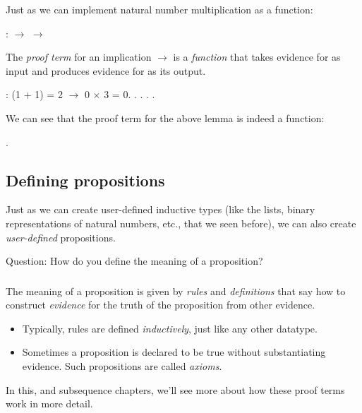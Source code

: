 \documentclass[12pt]{report}
\begin{document}
 Just as we can implement natural number multiplication as a
function:



 :  \ensuremath{\rightarrow}  \ensuremath{\rightarrow}  



The \textit{proof term} for an implication  \ensuremath{\rightarrow}  is a \textit{function} that
takes evidence for  as input and produces evidence for  as its
output.
\begin{coqdoccode}
\coqdocemptyline
\coqdocnoindent
{}  : (1 + 1) = 2  \ensuremath{\rightarrow}  0 \ensuremath{\times} 3 = 0.\coqdoceol
\coqdocnoindent
{}.  . . .\coqdoceol
\coqdocemptyline
\end{coqdoccode}
We can see that the proof term for the above lemma is indeed a
function: \begin{coqdoccode}
\coqdocemptyline
\coqdocnoindent
{} .\coqdoceol
\coqdocemptyline
\end{coqdoccode}
\subsection{Defining propositions}



 Just as we can create user-defined inductive types (like the
    lists, binary representations of natural numbers, etc., that we
    seen before), we can also create \textit{user-defined} propositions.


    Question: How do you define the meaning of a proposition?  


\subsubsection{ }



 The meaning of a proposition is given by \textit{rules} and \textit{definitions}
    that say how to construct \textit{evidence} for the truth of the
    proposition from other evidence.



\begin{itemize}
\item  Typically, rules are defined \textit{inductively}, just like any other
      datatype.



\item  Sometimes a proposition is declared to be true without
      substantiating evidence.  Such propositions are called \textit{axioms}.

\end{itemize}
    In this, and subsequence chapters, we'll see more about how these
    proof terms work in more detail.
\begin{coqdoccode}
\coqdocemptyline
\end{coqdoccode}
\end{document}
